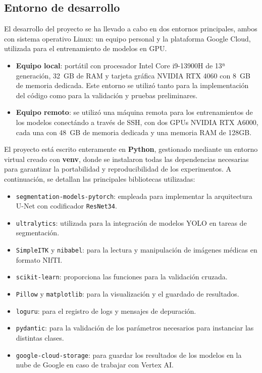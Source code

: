 \documentclass[../main.tex]{subfiles}
\begin{document}
\subsection{Entorno de desarrollo}

El desarrollo del proyecto se ha llevado a cabo en dos entornos principales, ambos con sistema operativo Linux: un equipo personal y la plataforma Google Cloud, utilizada para el entrenamiento de modelos en GPU.

\begin{itemize}
    \item \textbf{Equipo local}: portátil con procesador Intel Core i9-13900H de 13ª generación, 32~GB de RAM y tarjeta gráfica NVIDIA RTX 4060 con 8~GB de memoria dedicada. Este entorno se utilizó tanto para la implementación del código como para la validación y pruebas preliminares.
    
    \item \textbf{Equipo remoto}: se utilizó una máquina remota para los entrenamientos de los modelos conectándo a través de SSH, con dos GPUs NVIDIA RTX A6000, cada una con 48~GB de memoria dedicada y una memoria RAM de 128GB.
\end{itemize}

El proyecto está escrito enteramente en \textbf{Python}, gestionado mediante un entorno virtual creado con \textbf{venv}, donde se instalaron todas las dependencias necesarias para garantizar la portabilidad y reproducibilidad de los experimentos. A continuación, se detallan las principales bibliotecas utilizadas:

\begin{itemize}
    \item \texttt{segmentation-models-pytorch}: empleada para implementar la arquitectura U-Net con codificador \texttt{ResNet34}.
    \item \texttt{ultralytics}: utilizada para la integración de modelos YOLO en tareas de segmentación.
    \item \texttt{SimpleITK} y \texttt{nibabel}: para la lectura y manipulación de imágenes médicas en formato NIfTI.
    \item \texttt{scikit-learn}: proporciona las funciones para la validación cruzada.
    \item \texttt{Pillow} y \texttt{matplotlib}: para la visualización y el guardado de resultados.
    \item \texttt{loguru}: para el registro de logs y mensajes de depuración.
    \item \texttt{pydantic}: para la validación de los parámetros necesarios para instanciar las distintas clases.
    \item \texttt{google-cloud-storage}: para guardar los resultados de los modelos en la nube de Google en caso de trabajar con Vertex AI.
\end{itemize}
\end{document}
